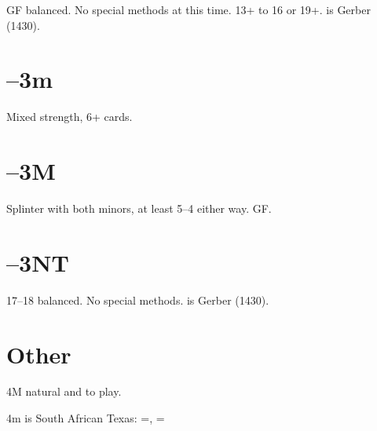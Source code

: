 \documentclass[tom-ari]{subfiles}
\begin{document}
GF balanced. No special methods at this time. 13+ to 16 or 19+.   is Gerber (1430).

\section[1D--3m]{--3m}

Mixed strength, 6+ cards.

\section[1D--3M]{--3M}

Splinter with both minors, at least 5--4 either way. GF.

\section[1D--3NT]{--3NT}

17--18 balanced. No special methods.  is Gerber (1430).

\section{Other}

4M natural and to play.

4m is South African Texas:  =\hhh, =\sss ~ 
\end{document}
